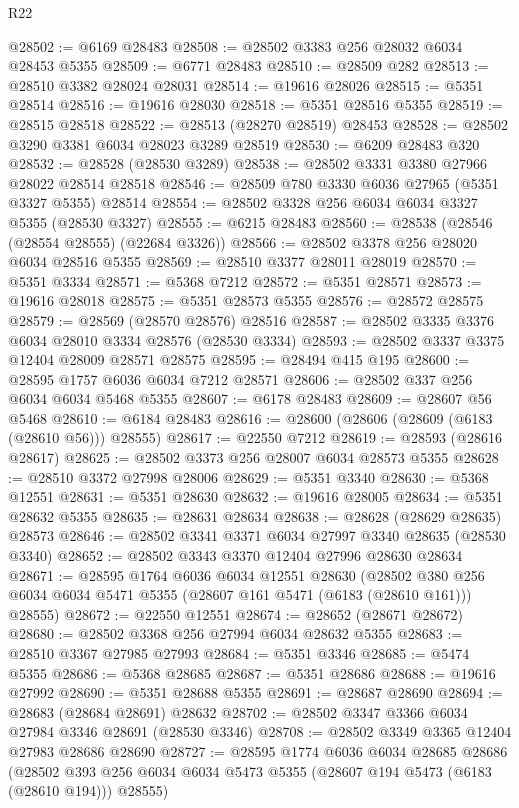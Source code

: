 \begin{lexlean}{R22}
\begin{coremodule}
@28502 := @6169 @28483
@28508 := @28502 @3383 @256 @28032 @6034 @28453 @5355
@28509 := @6771 @28483
@28510 := @28509 @282
@28513 := @28510 @3382 @28024 @28031
@28514 := @19616 @28026
@28515 := @5351 @28514
@28516 := @19616 @28030
@28518 := @5351 @28516 @5355
@28519 := @28515 @28518
@28522 := @28513 (@28270 @28519) @28453
@28528 := @28502 @3290 @3381 @6034 @28023 @3289 @28519
@28530 := @6209 @28483 @320
@28532 := @28528 (@28530 @3289)
@28538 := @28502 @3331 @3380 @27966 @28022 @28514 @28518
@28546 := @28509 @780 @3330 @6036 @27965 (@5351 @3327 @5355) @28514
@28554 := @28502 @3328 @256 @6034 @6034 @3327 @5355 (@28530 @3327)
@28555 := @6215 @28483
@28560 := @28538 (@28546 (@28554 @28555) (@22684 @3326))
@28566 := @28502 @3378 @256 @28020 @6034 @28516 @5355
@28569 := @28510 @3377 @28011 @28019
@28570 := @5351 @3334
@28571 := @5368 @7212
@28572 := @5351 @28571
@28573 := @19616 @28018
@28575 := @5351 @28573 @5355
@28576 := @28572 @28575
@28579 := @28569 (@28570 @28576) @28516
@28587 := @28502 @3335 @3376 @6034 @28010 @3334 @28576 (@28530 @3334)
@28593 := @28502 @3337 @3375 @12404 @28009 @28571 @28575
@28595 := @28494 @415 @195
@28600 := @28595 @1757 @6036 @6034 @7212 @28571
@28606 := @28502 @337 @256 @6034 @6034 @5468 @5355
@28607 := @6178 @28483
@28609 := @28607 @56 @5468
@28610 := @6184 @28483
@28616 := @28600 (@28606 (@28609 (@6183 (@28610 @56))) @28555)
@28617 := @22550 @7212
@28619 := @28593 (@28616 @28617)
@28625 := @28502 @3373 @256 @28007 @6034 @28573 @5355
@28628 := @28510 @3372 @27998 @28006
@28629 := @5351 @3340
@28630 := @5368 @12551
@28631 := @5351 @28630
@28632 := @19616 @28005
@28634 := @5351 @28632 @5355
@28635 := @28631 @28634
@28638 := @28628 (@28629 @28635) @28573
@28646 := @28502 @3341 @3371 @6034 @27997 @3340 @28635 (@28530 @3340)
@28652 := @28502 @3343 @3370 @12404 @27996 @28630 @28634
@28671 := @28595
    @1764
    @6036
    @6034
    @12551
    @28630
    (@28502 @380 @256 @6034 @6034 @5471 @5355 (@28607 @161 @5471 (@6183 (@28610 @161))) @28555)
@28672 := @22550 @12551
@28674 := @28652 (@28671 @28672)
@28680 := @28502 @3368 @256 @27994 @6034 @28632 @5355
@28683 := @28510 @3367 @27985 @27993
@28684 := @5351 @3346
@28685 := @5474 @5355
@28686 := @5368 @28685
@28687 := @5351 @28686
@28688 := @19616 @27992
@28690 := @5351 @28688 @5355
@28691 := @28687 @28690
@28694 := @28683 (@28684 @28691) @28632
@28702 := @28502 @3347 @3366 @6034 @27984 @3346 @28691 (@28530 @3346)
@28708 := @28502 @3349 @3365 @12404 @27983 @28686 @28690
@28727 := @28595
    @1774
    @6036
    @6034
    @28685
    @28686
    (@28502 @393 @256 @6034 @6034 @5473 @5355 (@28607 @194 @5473 (@6183 (@28610 @194))) @28555)

\end{coremodule}
\end{lexlean}

